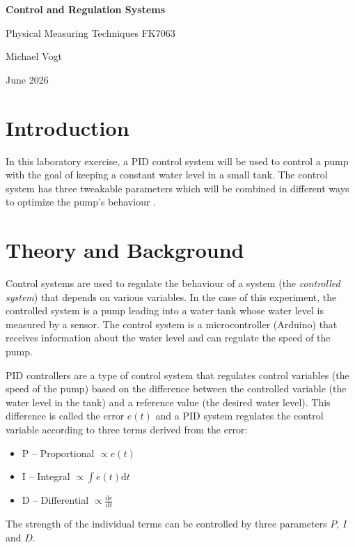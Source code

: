 \documentclass[a4paper]{scrartcl}
\begin{document}
\begin{center}
\vspace*{1cm}

\LARGE
  \textbf{Control and Regulation Systems}

\vspace{.2cm}

\normalsize
  Physical Measuring Techniques FK7063

\vspace{.5cm}
{Michael Vogt}

June 2026
\end{center}

\vspace{1cm}



\section*{Introduction}
In this laboratory exercise, a PID control system will be used to control a pump with the
goal of keeping a constant water level in a small tank. The control system has
three tweakable parameters which will be combined in different ways
to optimize the pump's behaviour \cite{manual}.




\section{Theory and Background}
Control systems are used to regulate the behaviour of a system (the \textit{controlled system})
that depends on various variables. In the case of this experiment, the controlled system is
a pump leading into a water tank whose water level is measured by a sensor. The control system
is a microcontroller (Arduino) that receives information about the water level and can
regulate the speed of the pump.

PID controllers are a type of control system that regulates control variables (the speed of the pump)
based on the difference between the controlled variable (the water level in the tank) %
and a reference value (the desired water level). This difference is called the error $e(t)$
and a PID system regulates the control variable according to three terms derived from the error:
\begin{itemize}
  \item P -- Proportional $\propto e(t)$
  \item I -- Integral $\propto \int e(t) \text{d}t$
  \item D -- Differential $\propto \frac{\text{d}e}{\text{d}t}$
\end{itemize}
The strength of the individual terms can be controlled by three parameters $P$, $I$ and $D$.
\end{document}
